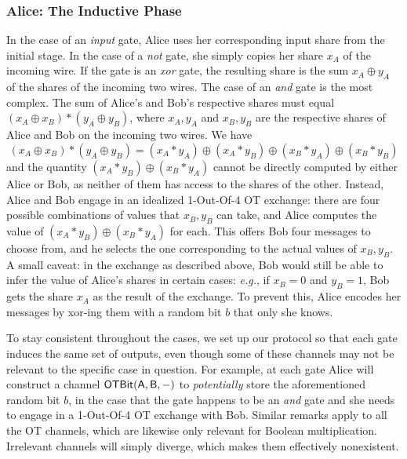 \subsubsection{Alice: The Inductive Phase}
In the case of an \emph{input} gate, Alice uses her corresponding input share from the initial stage. In the case of a \emph{not} gate, she simply copies her share $x_A$ of the incoming wire. If the gate is an \emph{xor} gate, the resulting share is the sum $x_A \oplus y_A$ of the shares of the incoming two wires. The case of an \emph{and} gate is the most complex. The sum of Alice's and Bob's respective shares must equal $(x_A \oplus x_B) * (y_A \oplus y_B)$, where $x_A,y_A$ and $x_B,y_B$ are the respective shares of Alice and Bob on the incoming two wires. We have
\[(x_A \oplus x_B) * (y_A \oplus y_B) = (x_A * y_A) \oplus (x_A * y_B) \oplus (x_B * y_A) \oplus (x_B * y_B)\]
and the quantity $(x_A * y_B) \oplus (x_B * y_A)$ cannot be directly computed by either Alice or Bob, as neither of them has access to the shares of the other. Instead, Alice and Bob engage in an idealized 1-Out-Of-4 OT exchange: there are four possible combinations of values that $x_B,y_B$ can take, and Alice computes the value of $(x_A * y_B) \oplus (x_B * y_A)$ for each. This offers Bob four messages to choose from, and he selects the one corresponding to the actual values of $x_B,y_B$. A small caveat: in the exchange as described above, Bob would still be able to infer the value of Alice's shares in certain cases: \emph{e.g.}, if $x_B = 0$ and $y_B = 1$, Bob gets the share $x_A$ as the result of the exchange. To prevent this, Alice encodes her messages by xor-ing them with a random bit $b$ that only she knows.

To stay consistent throughout the cases, we set up our protocol so that each gate induces the same set of outputs, even though some of these channels may not be relevant to the specific case in question. For example, at each gate Alice will construct a channel $\mathsf{OTBit}(\mathsf{A},\mathsf{B},-)$ to \emph{potentially} store the aforementioned random bit $b$, in the case that the gate happens to be an \emph{and} gate and she needs to engage in a 1-Out-Of-4 OT exchange with Bob. Similar remarks apply to all the OT channels, which are likewise only relevant for Boolean multiplication. Irrelevant channels will simply diverge, which makes them effectively nonexistent.

